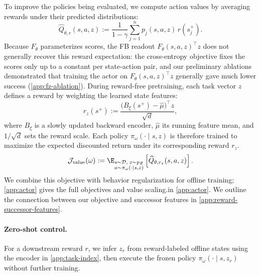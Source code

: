 To improve the policies being evaluated, we compute action values by averaging rewards under their predicted distributions:
\begin{equation}
    \widehat Q_{\theta,r}(s,a,z) :=\frac{1}{1-\gamma} \sum_{j=1}^n p_j(s,a,z)\,r(s_j^+).
     \label{eq:density-value}
\end{equation}
Because $F_\theta$ parameterizes scores, the FB readout $F_\theta(s,a,z)^\top z$ does not generally recover this reward expectation: the cross-entropy objective fixes the scores only up to a constant per state-action pair, and our preliminary ablations demonstrated that training the actor on $F_\theta(s,a,z)^\top z$ generally gave much lower success (\cref{app:fz-ablation}).
During reward-free pretraining, each task vector $z$ defines a reward by weighting the learned state features:
\begin{equation}
    r_z(s^+) :=\frac{\bigl(B_\xi(s^+)-\hat\mu\bigr)^\top z}{\sqrt d},
    \label{eq:pretraining-reward}
\end{equation}
where $B_\xi$ is a slowly updated backward encoder, $\hat\mu$ its running feature mean, and $1/\sqrt d$ sets
the reward scale.
Each policy $\pi_\omega(\cdot\mid s,z)$ is therefore trained to maximize the expected discounted return under its corresponding reward $r_z$.
\begin{equation}
    \mathcal J_{\mathrm{value}}(\omega) := \E_{\substack{ s\sim\mathcal D,\;z\sim p_Z\\ a\sim\pi_\omega(\cdot\mid s,z) }} \left[\widehat Q_{\theta,r_z}(s,a,z)\right].
    \label{eq:density-policy-objective}
\end{equation}
We combine this objective with behavior regularization for offline training; \cref{app:actor} gives the full objectives and value scaling.in \cref{app:actor}.
We outline the connection between our objective and successor features in \cref{app:reward-successor-features}.

\paragraph{Zero-shot control.}
\label{sec:method-control}
For a downstream reward $r$, we infer $z_r$ from reward-labeled offline states using the encoder in \cref{app:task-index}, then execute the frozen policy $\pi_\omega(\cdot\mid s,z_r)$ without further training.


